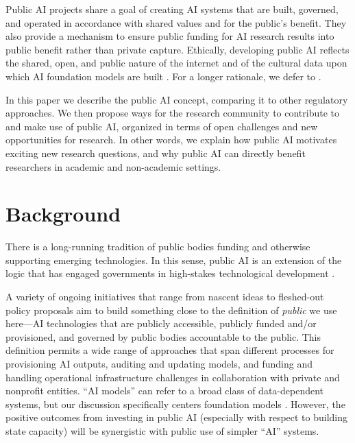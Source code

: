 \documentclass{article}
\begin{document}
Public AI projects share a goal of creating AI systems that are built, governed, and operated in accordance with shared values and for the public’s benefit. They also provide a mechanism to ensure public funding for AI research results into public benefit rather than private capture. Ethically, developing public AI reflects the shared, open, and public nature of the internet and of the cultural data upon which AI foundation models are built \cite{huangGenerativeAIDigital2023,liDimensionsDataLabor2023}. For a longer rationale, we defer to \cite{publicai}.



In this paper we describe the public AI concept, comparing it to other regulatory approaches. We then propose ways for the research community to contribute to and make use of public AI, organized in terms of open challenges and new opportunities for research. In other words, we explain how public AI motivates exciting new research questions, and why public AI can directly benefit researchers in academic and non-academic settings.

\section{Background}
There is a long-running tradition of public bodies funding and otherwise supporting emerging technologies. In this sense, public AI is an extension of the logic that has engaged governments in high-stakes technological development \cite{dolfsmaGovernmentPolicyTechnological2013}.

A variety of ongoing initiatives that range from nascent ideas to fleshed-out policy proposals aim to build something close to the definition of \emph{public} we use here---AI technologies that are publicly accessible, publicly funded and/or provisioned, and governed by public bodies accountable to the public. This definition permits a wide range of approaches that span different processes for provisioning AI outputs, auditing and updating models, and funding and handling operational infrastructure challenges in collaboration with private and nonprofit entities. ``AI models'' can refer to a broad class of data-dependent systems, but our discussion specifically centers foundation models \cite{bommasani2021opportunities}. However, the positive outcomes from investing in public AI (especially with respect to building state capacity) will be synergistic with public use of simpler ``AI'' systems.
\end{document}
